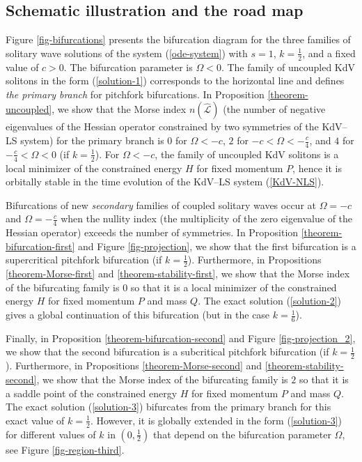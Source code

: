 \documentclass[12pt,reqno]{amsart}
\numberwithin{equation}{section}
\begin{document}
\subsection{Schematic illustration and the road map}

Figure \ref{fig-bifurcations} presents the bifurcation diagram for the three families of solitary wave solutions of the system (\ref{ode-system}) with 
$s = 1$, $k = \frac{1}{2}$, and a fixed value of $c > 0$. The bifurcation parameter is $\Omega < 0$. The family of uncoupled KdV solitons in the form (\ref{solution-1}) corresponds to the horizontal line and defines {\em the primary branch} for pitchfork bifurcations. In Proposition \ref{theorem-uncoupled}, we show that the Morse index $n(\widehat{\mathcal{L}})$ 
(the number of negative eigenvalues of the Hessian operator constrained by two symmetries of the KdV--LS system) for the primary branch is $0$ for $\Omega < -c$, 
$2$ for $-c < \Omega < -\frac{c}{4}$, and $4$ for $-\frac{c}{4} < \Omega < 0$ (if $k = \frac{1}{2}$). For $\Omega < -c$, the family of uncoupled KdV 
solitons is a local minimizer of the constrained energy $H$ for fixed momentum $P$, hence it is orbitally stable 
in the time evolution of the KdV--LS system (\ref{KdV-NLS}). 

Bifurcations of new {\em secondary} families of coupled solitary waves 
occur at $\Omega = -c$ 
and $\Omega = -\frac{c}{4}$ when the nullity index (the multiplicity of the zero eigenvalue of the Hessian operator) exceeds 
the number of symmetries. In Proposition \ref{theorem-bifurcation-first} and Figure \ref{fig-projection}, we show that the first bifurcation is a supercritical 
pitchfork bifurcation (if $k = \frac{1}{2}$). Furthermore, 
in Propositions \ref{theorem-Morse-first} and \ref{theorem-stability-first}, 
we show that the Morse index of the bifurcating family is $0$ so that it is a local minimizer of the constrained energy $H$ 
for fixed momentum $P$ and mass $Q$. The exact solution (\ref{solution-2}) gives a global continuation 
of this bifurcation (but in the case $k = \frac{1}{6}$). 

Finally, in Proposition \ref{theorem-bifurcation-second} and Figure \ref{fig-projection_2}, we show that the second bifurcation is a subcritical 
pitchfork bifurcation (if $k = \frac{1}{2}$). Furthermore, 
in Propositions \ref{theorem-Morse-second} and \ref{theorem-stability-second}, 
we show that the Morse index of the bifurcating family is $2$ so that it is a saddle point of the constrained energy $H$ 
for fixed momentum $P$ and mass $Q$. The exact solution (\ref{solution-3}) bifurcates from the primary branch for this exact value of $k = \frac{1}{2}$. However, it is globally extended 
in the form (\ref{solution-3}) for different values of $k$ in $\left(0,\frac{1}{2}\right)$ that depend on the 
bifurcation parameter $\Omega$, see Figure \ref{fig-region-third}.
\end{document}

